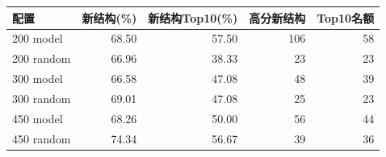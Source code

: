 \begin{tabular*}{\linewidth}{@{\extracolsep{\fill}}lrrrr@{}}
\toprule
配置 & 新结构(\%) & 新结构Top10(\%) & 高分新结构 & Top10名额\\
\midrule
200 model & 68.50 & 57.50 & 106 & 58 \\
200 random & 66.96 & 38.33 & 23 & 23 \\
300 model & 66.58 & 47.08 & 48 & 39 \\
300 random & 69.01 & 47.08 & 25 & 23 \\
450 model & 68.26 & 50.00 & 56 & 44 \\
450 random & 74.34 & 56.67 & 39 & 36 \\
\bottomrule
\end{tabular*}